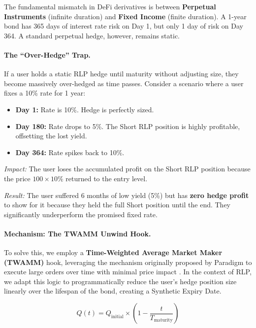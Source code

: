 \documentclass[12pt]{article}
\begin{document}
The fundamental mismatch in DeFi derivatives is between \textbf{Perpetual Instruments} (infinite duration) and \textbf{Fixed Income} (finite duration). A 1-year bond has 365 days of interest rate risk on Day 1, but only 1 day of risk on Day 364. A standard perpetual hedge, however, remains static.

\paragraph{The ``Over-Hedge'' Trap.}
If a user holds a static RLP hedge until maturity without adjusting size, they become massively over-hedged as time passes. Consider a scenario where a user fixes a 10\% rate for 1 year:

\begin{itemize}
    \item \textbf{Day 1:} Rate is 10\%. Hedge is perfectly sized.
    \item \textbf{Day 180:} Rate drops to 5\%. The Short RLP position is highly profitable, offsetting the lost yield.
    \item \textbf{Day 364:} Rate spikes back to 10\%.
\end{itemize}

\emph{Impact:} The user loses the accumulated profit on the Short RLP position because the price $100 \times 10\%$ returned to the entry level.

\emph{Result:} The user suffered 6 months of low yield (5\%) but has \textbf{zero hedge profit} to show for it because they held the full Short position until the end. They significantly underperform the promised fixed rate.

\paragraph{Mechanism: The TWAMM Unwind Hook.}
To solve this, we employ a \textbf{Time-Weighted Average Market Maker (TWAMM)} hook, leveraging the mechanism originally proposed by Paradigm to execute large orders over time with minimal price impact \cite{white2021twamm}. In the context of RLP, we adapt this logic to programmatically reduce the user's hedge position size linearly over the lifespan of the bond, creating a Synthetic Expiry Date.

\begin{equation}
    Q(t) = Q_{\text{initial}} \times \left(1 - \frac{t}{T_{\text{maturity}}}\right)
\end{equation}
\end{document}
